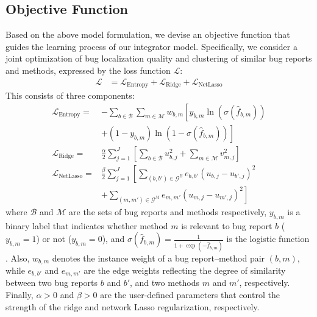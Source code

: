 \subsection{Objective Function}
\label{subsec:objective}


Based on the above model formulation, we devise an objective function that guides the learning process of our integrator model. Specifically, we consider a joint optimization of bug localization quality and clustering of similar bug reports and methods, expressed by the loss function $\mathcal{L}$:
\begin{align}
\label{eq:NL_lossfunc}
\mathcal{L} &= \mathcal{L}_\text{Entropy} + \mathcal{L}_\text{Ridge} + \mathcal{L}_\text{NetLasso}
\end{align}
This consists of three components:
\begin{align}
\label{eq:entropy}
\mathcal{L}_\text{Entropy} = & -\sum_{b \in \mathcal{B}} \sum_{m \in \mathcal{M}} w_{b,m} \left[y_{b,m} \ln(\sigma(\hat{f}_{b,m})) \right. \nonumber\\
	& + \left. (1 - y_{b,m}) \ln(1- \sigma(\hat{f}_{b,m})) \right] \\
\label{eq:ridge}
\mathcal{L}_\text{Ridge} = &\frac{\alpha}{2} \sum_{j=1}^{J} \left[\sum_{b \in \mathcal{B}} u_{b,j}^2 + \sum_{m \in \mathcal{M}} v_{m,j}^2 \right] \\
\label{eq:netlasso}
\mathcal{L}_\text{NetLasso} = & \frac{\beta}{2} \sum_{j=1}^{J} \left[ \sum_{(b, b') \in \mathcal{G}^B}^{} e_{b, b'} (u_{b,j} - u_{b', j})^2 \right. \nonumber\\ 
	& + \left. \sum_{(m, m') \in \mathcal{G}^M}^{} e_{m, m'} (u_{m,j} - u_{m', j})^2 \right]
\end{align}
where $\mathcal{B}$ and $\mathcal{M}$ are the sets of bug reports and methods respectively, $y_{b,m}$ is a binary label that indicates whether method $m$ is relevant to bug report $b$ ($y_{b,m} = 1$) or not ($y_{b,m} = 0$), and $\sigma(\hat{f}_{b,m}) = \frac{1}{1 + \exp(-\hat{f}_{b,m})}$ is the logistic function \cite{Collins:2002:LRA:599615.599689}. Also, $w_{b,m}$ denotes the instance weight of a bug report--method pair $(b,m)$, while $e_{b,b'}$ and $e_{m,m'}$ are the edge weights reflecting the degree of similarity between two bug reports $b$ and $b'$, and two methods $m$ and $m'$, respectively. Finally, $\alpha > 0$ and $\beta > 0$ are the user-defined parameters that control the strength of the ridge and network Lasso regularization, respectively.

